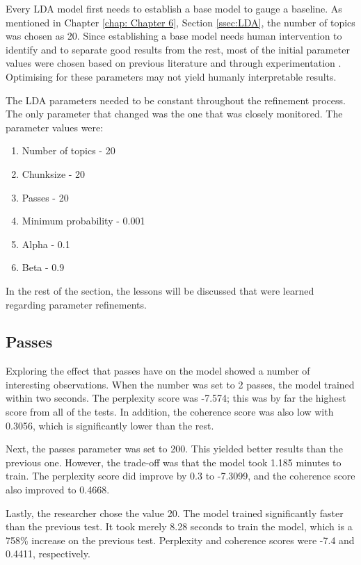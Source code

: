 Every LDA model first needs to establish a base model to gauge a baseline. As mentioned in Chapter \ref{chap: Chapter 6}, Section \ref{ssec:LDA}, the number of topics was chosen as 20. Since establishing a base model needs human intervention to identify and to separate good results from the rest, most of the initial parameter values were chosen based on previous literature and through experimentation \cite{baghel2010frequent}. Optimising for these parameters may not yield humanly interpretable results.

The LDA parameters needed to be constant throughout the refinement process. The only parameter that changed was the one that was closely monitored. The parameter values were:

\begin{enumerate}
    \item Number of topics - 20
    \item Chunksize - 20
    \item Passes - 20
    \item Minimum probability - 0.001
    \item Alpha - 0.1
    \item Beta - 0.9
\end{enumerate}

In the rest of the section, the lessons will be discussed that were learned regarding parameter refinements. 

\subsection{Passes}

Exploring the effect that passes have on the model showed a number of interesting observations. When the number was set to 2 passes, the model trained within two seconds. The perplexity score was -7.574; this was by far the highest score from all of the tests. In addition, the coherence score was also low with 0.3056, which is significantly lower than the rest.

Next, the passes parameter was set to 200. This yielded better results than the previous one. However, the trade-off was that the model took 1.185 minutes to train. The perplexity score did improve by 0.3 to -7.3099, and the coherence score also improved to 0.4668.

Lastly, the researcher chose the value 20. The model trained significantly faster than the previous test. It took merely 8.28 seconds to train the model, which is a 758\% increase on the previous test. Perplexity and coherence scores were -7.4 and 0.4411, respectively.


